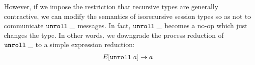 However, if we impose the restriction that recursive types are
generally contractive, we can modify the semantics of isorecursive
session types so as not to communicate $\mathtt{unroll}\; \_$ messages. In fact,
$\mathtt{unroll}\; \_$ becomes a no-op which just changes the type. In other
words, we downgrade the process reduction of $\mathtt{unroll}\; \_$ to a simple
expression reduction:
\begin{gather*}
  E[\mathtt{unroll}\; a] \stackrel{}\rightarrow a
\end{gather*}


